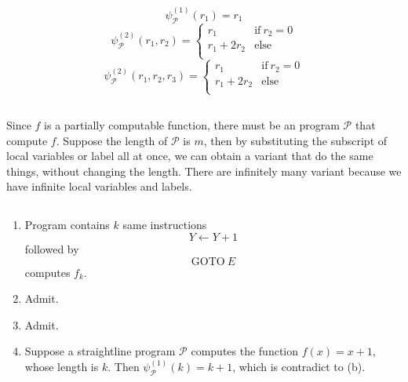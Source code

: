 \subsection{}
\[ \psi_{\mathscr{P}}^{(1)}(r_{1}) = r_{1} \]
\[ \psi_{\mathscr{P}}^{(2)}(r_{1},r_{2}) = \left\{
   \begin{array}{ll}
     r_{1}        & \mathrm{if}\ r_{2} = 0 \\
     r_{1}+2r_{2} & \mathrm{else} \\
   \end{array}
   \right. 
\]
\[ \psi_{\mathscr{P}}^{(2)}(r_{1},r_{2},r_{3}) = \left\{
   \begin{array}{ll}
     r_{1}        & \mathrm{if}\ r_{2} = 0 \\
     r_{1}+2r_{2} & \mathrm{else} \\
   \end{array}
   \right. 
\]

\subsection{}
Since $f$ is a partially computable function, there must be an program 
$\mathscr{P}$ that compute $f$. Suppose the length of $\mathscr{P}$ is 
$m$, then by substituting the subscript of local variables or label all 
at once, we can obtain a variant that do the same things, without changing 
the length. There are infinitely many variant because we have infinite 
local variables and labels.

\subsection{}
\begin{enumerate}
\item 
Program contains $k$ same instructions \[ Y \gets Y + 1 \] followed by 
\[ \mathrm{GOTO}\ E \] computes $f_{k}$.

\item Admit.
\item Admit.

\item
Suppose a straightline program $\mathscr{P}$ computes the function 
$ f(x) = x + 1 $, whose length is $k$. Then $ \psi_{\mathscr{P}}^{(1)}(k) = k+1 $, 
which is contradict to (b).
\end{enumerate}
